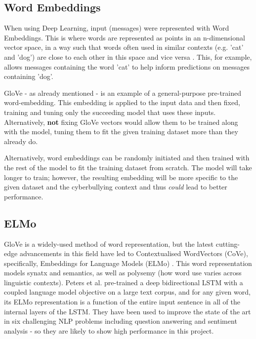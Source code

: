 \documentclass[12pt,a4paper]{article}
\begin{document}
\subsection{Word Embeddings}
When using Deep Learning, input (messages) were represented with Word Embeddings. This is where words are represented as points in an n-dimensional vector space, in a way such that words often used in similar contexts (e.g. 'cat' and 'dog') are close to each other in this space and vice versa \cite[p.464]{DL}. This, for example, allows messages containing the word 'cat' to help inform predictions on messages containing 'dog'.

GloVe \cite{glove} - as already mentioned - is an example of a general-purpose pre-trained word-embedding. This embedding is applied to the input data and then fixed, training and tuning only the succeeding model that uses these inputs. Alternatively, \textbf{not} fixing GloVe vectors would allow them to be trained along with the model, tuning them to fit the given training dataset more than they already do.

Alternatively, word embeddings can be randomly initiated and then trained with the rest of the model to fit the training dataset from scratch. The model will take longer to train; however, the resulting embedding will be more specific to the given dataset and the cyberbullying context and thus \textit{could} lead to better performance. 

\subsection{ELMo}
GloVe is a widely-used method of word representation, but the latest cutting-edge advancements in this field have led to Contextualised WordVectors (CoVe), specifically, Embeddings for Language Models (ELMo) \cite{Peters}. This word representation models synatx and semantics, as well as polysemy (how word use varies across linguistic contexts). Peters et al. pre-trained a deep bidirectional LSTM with a coupled language model objective on a large text corpus, and for any given word, its ELMo representation is a function of the entire input sentence in all of the internal layers of the LSTM. They have been used to improve the state of the art in six challenging NLP problems including question answering and sentiment analysis - so they are likely to show high performance in this project.
\end{document}
